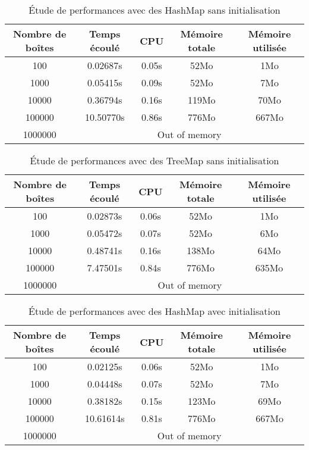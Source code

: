 \begin{table}[htpb]
  \centering
\begin{tabular}{|c|c|c|c|c|}
\hline
Nombre de boîtes & Temps écoulé & CPU & Mémoire totale & Mémoire utilisée\\
\hline
100 & 0.02687s & 0.05s & 52Mo & 1Mo\\
\hline
1000 & 0.05415s & 0.09s & 52Mo & 7Mo\\
\hline
10000 & 0.36794s & 0.16s & 119Mo & 70Mo\\
\hline
100000 & 10.50770s & 0.86s & 776Mo & 667Mo\\
\hline
1000000 & \multicolumn{4}{|c|}{Out of memory}\\
\hline
\end{tabular}
\caption{Étude de performances avec des HashMap sans initialisation}
\label{tab:hashmap1}
\end{table}

\begin{table}[htbp]
  \centering
\begin{tabular}{|c|c|c|c|c|}
\hline
Nombre de boîtes & Temps écoulé & CPU & Mémoire totale & Mémoire utilisée\\
\hline
100 & 0.02873s & 0.06s & 52Mo & 1Mo\\
\hline
1000 & 0.05472s & 0.07s & 52Mo & 6Mo\\
\hline
10000 & 0.48741s & 0.16s & 138Mo & 64Mo\\
\hline
100000 & 7.47501s & 0.84s & 776Mo & 635Mo\\
\hline
1000000 & \multicolumn{4}{|c|}{Out of memory}\\
\hline
\end{tabular}
\caption{Étude de performances avec des TreeMap sans initialisation}
\label{tab:treemap1}
\end{table}

\begin{table}[htbp]
  \centering
\begin{tabular}{|c|c|c|c|c|}
\hline
Nombre de boîtes & Temps écoulé & CPU & Mémoire totale & Mémoire utilisée\\
\hline
100 & 0.02125s & 0.06s & 52Mo & 1Mo\\
\hline
1000 & 0.04448s & 0.07s & 52Mo & 7Mo\\
\hline
10000 & 0.38182s & 0.15s & 123Mo & 69Mo\\
\hline
100000 & 10.61614s & 0.81s & 776Mo & 667Mo\\
\hline
1000000 & \multicolumn{4}{|c|}{Out of memory}\\
\hline
\end{tabular}
\caption{Étude de performances avec des HashMap avec initialisation}
\label{tab:hashmap2}
\end{table}

